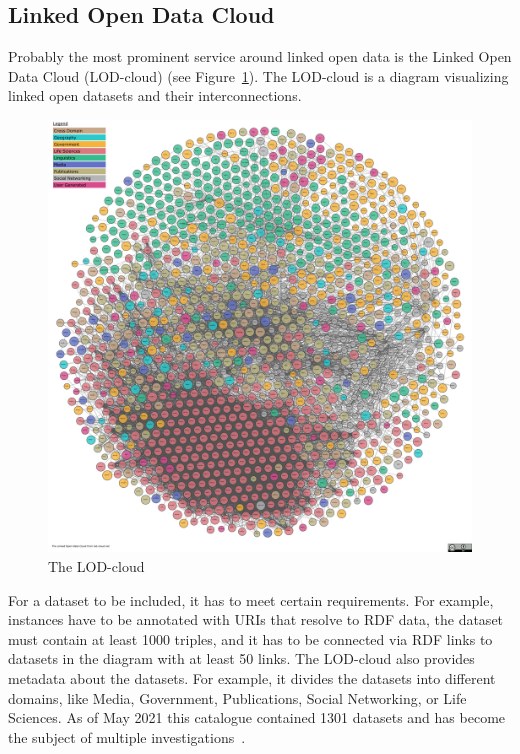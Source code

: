 \documentclass[runningheads]{llncs}
\begin{document}
    \subsection{Linked Open Data Cloud}
    Probably the most prominent service around linked open data is the Linked Open Data Cloud (LOD-cloud)
    \footnotemark{} (see Figure~\ref{fig:lod_cloud}).
    The LOD-cloud is a diagram visualizing linked open datasets and their interconnections.

    \begin{figure}[ht]
        \centering
        \includegraphics[width=\textwidth]{figures/lod-cloud-sm}
        \caption{The LOD-cloud\protect\footnotemark[\value{footnote}]}
        \label{fig:lod_cloud}
    \end{figure}

    For a dataset to be included, it has to meet certain requirements.
    For example, instances have to be annotated with URIs that resolve to RDF data, the dataset must contain at least 1000 triples, and it has to be connected via RDF links to datasets in the diagram with at least 50 links.
    The LOD-cloud also provides metadata about the datasets.
    For example, it divides the datasets into different domains, like Media, Government, Publications, Social Networking, or Life Sciences.
    As of May 2021 this catalogue contained 1301 datasets and has become the subject of multiple investigations~\citep{debattista2019lod, kamdar2019enabling, schmachtenberg2014adoption}.
\end{document}
